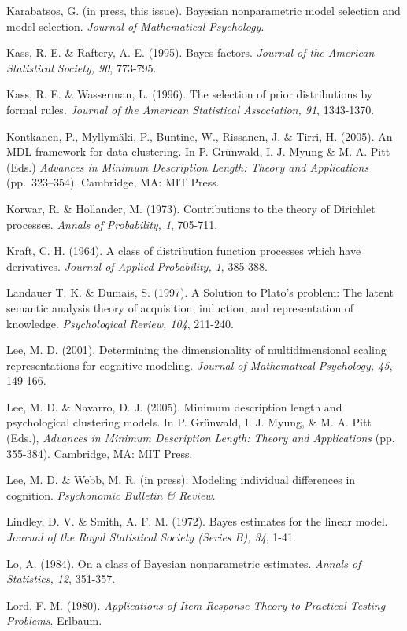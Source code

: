 \documentclass[authoryear]{elsarticle}
\begin{document}
\begin{list}{}{\setlength{\leftmargin}{12pt}\setlength{\itemindent}{-12pt}\setlength{\parsep}{0pt}}
\item Karabatsos, G. (in press, this issue). Bayesian nonparametric model selection and model selection. {\it Journal of Mathematical Psychology}.
\item Kass, R. E. \& Raftery, A. E. (1995). Bayes factors. {\it Journal of the American Statistical Society, 90}, 773-795.
\item Kass, R. E. \& Wasserman, L. (1996). The selection of prior distributions by formal rules. {\it Journal of the American Statistical Association, 91}, 1343-1370.
\item Kontkanen, P., Myllym\"{a}ki, P., Buntine, W., Rissanen, J. \& Tirri, H. (2005). An MDL framework for data clustering. In P. Gr\"{u}nwald, I. J. Myung \& M. A. Pitt (Eds.) {\it Advances in Minimum Description Length: Theory and Applications} (pp.~323--354). Cambridge, MA: MIT Press.
\item Korwar, R. \& Hollander, M. (1973). Contributions to the theory of Dirichlet processes. {\it Annals of Probability, 1}, 705-711.
\item Kraft, C. H. (1964). A class of distribution function processes which have derivatives. {\it Journal of Applied
Probability, 1}, 385-388.
\item Landauer T. K. \& Dumais, S. (1997). A Solution to Plato's problem: The latent semantic analysis theory of acquisition, induction, and representation of knowledge. {\it Psychological Review, 104}, 211-240.
\item Lee, M. D. (2001). Determining the dimensionality of multidimensional scaling representations for cognitive modeling. {\it Journal of Mathematical Psychology, 45}, 149-166.
\item Lee, M. D. \& Navarro, D. J. (2005). Minimum description length and psychological clustering models. In P. Gr\"{u}nwald, I. J. Myung, \& M. A. Pitt (Eds.), {\it Advances in Minimum Description Length: Theory and Applications} (pp. 355-384). Cambridge, MA: MIT Press.
\item Lee, M. D. \& Webb, M. R. (in press). Modeling individual differences in cognition. {\it Psychonomic Bulletin \& Review}.
\item Lindley, D. V. \& Smith, A. F. M. (1972). Bayes estimates for the linear model. {\it Journal of the Royal Statistical Society (Series B), 34}, 1-41.
\item Lo, A. (1984). On a class of Bayesian nonparametric estimates. {\it Annals of Statistics, 12}, 351-357.
\item Lord, F. M. (1980). {\it Applications of Item Response Theory to Practical Testing Problems}. Erlbaum.

\end{list}
\end{document}
